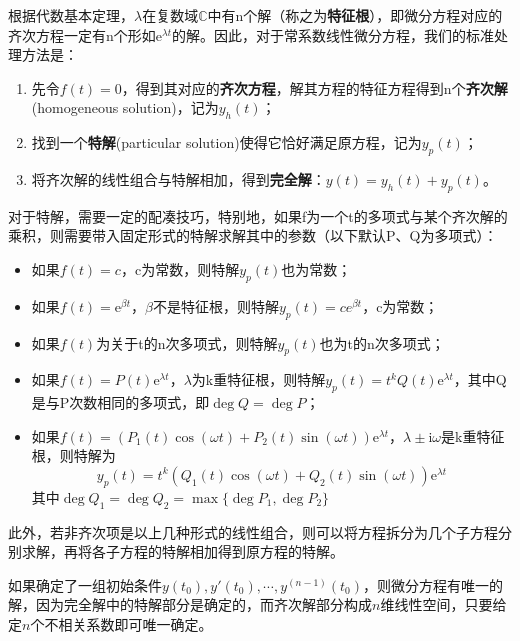 \documentclass{ctexbook}
\begin{document}
根据代数基本定理，$\lambda$在复数域$\mathbb{C}$中有n个解（称之为\textbf{特征根}），即微分方程对应的齐次方程一定有n个形如$\mathrm{e}^{\lambda t}$的解。因此，对于常系数线性微分方程，我们的标准处理方法是：
\begin{enumerate}
    \item 先令$f(t)=0$，得到其对应的\textbf{齐次方程}，解其方程的特征方程得到n个\textbf{齐次解}(homogeneous solution)，记为$y_h(t)$；
    \item 找到一个\textbf{特解}(particular solution)使得它恰好满足原方程，记为$y_p(t)$；
    \item 将齐次解的线性组合与特解相加，得到\textbf{完全解}：$y(t)=y_h(t)+y_p(t)$。
\end{enumerate}
对于特解，需要一定的配凑技巧，特别地，如果f为一个t的多项式与某个齐次解的乘积，则需要带入固定形式的特解求解其中的参数（以下默认P、Q为多项式）：\begin{itemize}
    \item 如果$f(t)=c$，c为常数，则特解$y_p(t)$也为常数；
    \item 如果$f(t)=\mathrm{e}^{\beta t}$，$\beta$不是特征根，则特解$y_p(t)=ce^{\beta t}$，c为常数；
    \item 如果$f(t)$为关于t的n次多项式，则特解$y_p(t)$也为t的n次多项式；
    \item 如果$f(t)=P(t)\mathrm{e}^{\lambda t}$，$\lambda$为k重特征根，则特解$y_p(t)=t^k Q(t)\mathrm{e}^{\lambda t}$，其中Q是与P次数相同的多项式，即$\deg Q=\deg P$；
    \item 如果$f(t)=(P_1(t)\cos(\omega t)+P_2(t)\sin(\omega t))\mathrm{e}^{\lambda t}$，$\lambda\pm \mathrm{i}\omega$是k重特征根，则特解为
    $$y_p(t)=t^k(Q_1(t)\cos(\omega t)+Q_2(t)\sin(\omega t))\mathrm{e}^{\lambda t}$$
    其中$\deg Q_1=\deg Q_2=\max\{\deg P_1,\deg P_2\}$
\end{itemize}
此外，若非齐次项是以上几种形式的线性组合，则可以将方程拆分为几个子方程分别求解，再将各子方程的特解相加得到原方程的特解。

如果确定了一组初始条件$y(t_0),y'(t_0),\cdots,y^{(n-1)}(t_0)$，则微分方程有唯一的解，因为完全解中的特解部分是确定的，而齐次解部分构成$n$维线性空间，只要给定$n$个不相关系数即可唯一确定。
\end{document}

